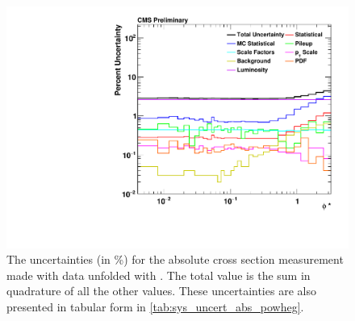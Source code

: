 \begin{figure}[!p]
    \centering
    \includegraphics[width=\textwidth]{figures/data_uncertainty_absolute_powheg_unfolded.pdf}
    \caption[
        The uncertainties for the absolute cross section measurement made with
        data unfolded with \PPsixZtwo.
    ]{
        The uncertainties (in \%) for the absolute cross section measurement
        made with data unfolded with \PPsixZtwo. The total value is the sum in
        quadrature of all the other values. These uncertainties are also
        presented in tabular form in \cref{tab:sys_uncert_abs_powheg}.
    }
    \label{fig:sys_uncert_abs_powheg}
\end{figure}
